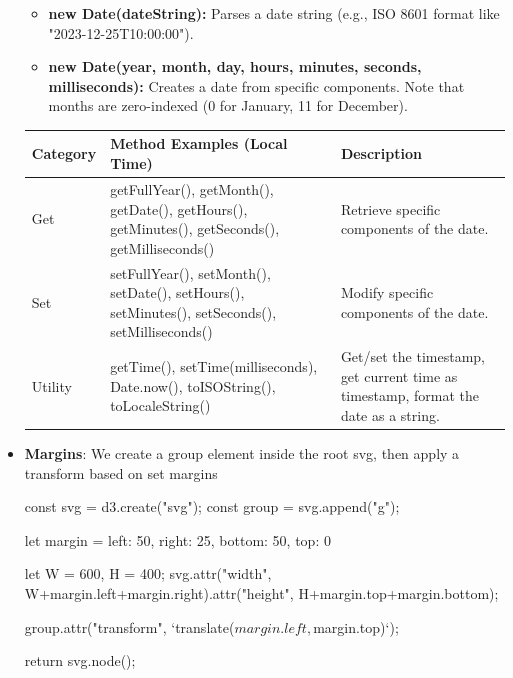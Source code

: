 \documentclass{report}
\begin{document}
\begin{itemize}
\begin{itemize}
                \item \textbf{new Date(dateString):} Parses a date string (e.g., ISO 8601 format like "2023-12-25T10:00:00").
                \item \textbf{new Date(year, month, day, hours, minutes, seconds, milliseconds):} Creates a date from specific components. Note that months are zero-indexed (0 for January, 11 for December).
            \end{itemize}
            \begin{center}
                \begin{tabularx}{\textwidth}{@{}XXX@{}}
                    \toprule 
                 \textbf{Category} 	&\textbf{Method Examples (Local Time)}	&\textbf{Description} \\
                    \midrule
                    Get	&getFullYear(), getMonth(), getDate(), getHours(), getMinutes(), getSeconds(), getMilliseconds()	&Retrieve specific components of the date.\\[2ex]
                    Set	&setFullYear(), setMonth(), setDate(), setHours(), setMinutes(), setSeconds(), setMilliseconds()	&Modify specific components of the date.\\[2ex]
                    Utility	&getTime(), setTime(milliseconds), Date.now(), toISOString(), toLocaleString()	&Get/set the timestamp, get current time as timestamp, format the date as a string. \\
                    \bottomrule
                \end{tabularx}
            \end{center}
        \item \textbf{Margins}: We create a group element inside the root svg, then apply a transform based on set margins
            \bigbreak \noindent 
            \begin{jscode}
                {
                    const svg = d3.create("svg");
                    const group = svg.append("g");

                    let margin = {left: 50, right: 25, bottom: 50, top: 0}

                    let W = 600, H = 400;
                    svg.attr("width", W+margin.left+margin.right).attr("height", H+margin.top+margin.bottom);

                    group.attr("transform", `translate(${margin.left}, ${margin.top})`);

                    return svg.node();
                }
            \end{jscode}

    \end{itemize}
\end{document}
